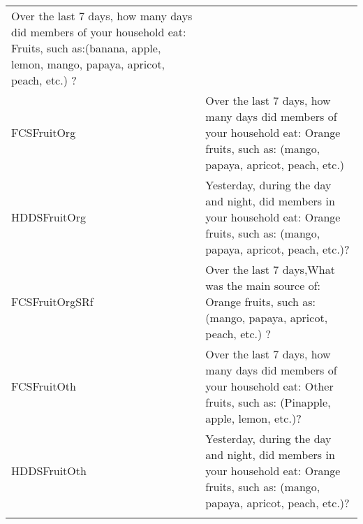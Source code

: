 \documentclass[
]{article}
\begin{document}
\begin{longtable}[]{@{}ll@{}}
\begin{minipage}[t]{0.72\columnwidth}
Over the last 7 days, how many days did members of your household eat: Fruits, such as:(banana, apple, lemon, mango, papaya, apricot, peach, etc.) ?\strut
\end{minipage}\tabularnewline
\begin{minipage}[t]{0.22\columnwidth}\raggedright
FCSFruitOrg\strut
\end{minipage} & \begin{minipage}[t]{0.72\columnwidth}\raggedright
Over the last 7 days, how many days did members of your household eat: Orange fruits, such as: (mango, papaya, apricot, peach, etc.)\strut
\end{minipage}\tabularnewline
\begin{minipage}[t]{0.22\columnwidth}\raggedright
HDDSFruitOrg\strut
\end{minipage} & \begin{minipage}[t]{0.72\columnwidth}\raggedright
Yesterday, during the day and night, did members in your household eat: Orange fruits, such as: (mango, papaya, apricot, peach, etc.)?\strut
\end{minipage}\tabularnewline
\begin{minipage}[t]{0.22\columnwidth}\raggedright
FCSFruitOrgSRf\strut
\end{minipage} & \begin{minipage}[t]{0.72\columnwidth}\raggedright
Over the last 7 days,What was the main source of: Orange fruits, such as: (mango, papaya, apricot, peach, etc.) ?\strut
\end{minipage}\tabularnewline
\begin{minipage}[t]{0.22\columnwidth}\raggedright
FCSFruitOth\strut
\end{minipage} & \begin{minipage}[t]{0.72\columnwidth}\raggedright
Over the last 7 days, how many days did members of your household eat: Other fruits, such as: (Pinapple, apple, lemon, etc.)?\strut
\end{minipage}\tabularnewline
\begin{minipage}[t]{0.22\columnwidth}\raggedright
HDDSFruitOth\strut
\end{minipage} & \begin{minipage}[t]{0.72\columnwidth}\raggedright
Yesterday, during the day and night, did members in your household eat: Orange fruits, such as: (mango, papaya, apricot, peach, etc.)?\strut
\end{minipage}\tabularnewline
\begin{minipage}[t]{0.22\columnwidth}\raggedright

\end{minipage}
\end{longtable}
\end{document}
